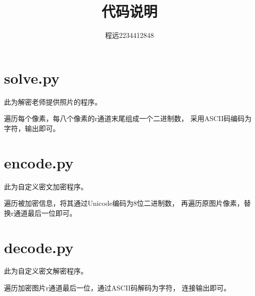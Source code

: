 \documentclass[UTF8]{ctexart}
\begin{document}
\title{\vspace{0cm}代码说明}
\author{程远2234412848}
\date{}
\maketitle

\section{solve.py}
此为解密老师提供照片的程序。

遍历每个像素，每八个像素的r通道末尾组成一个二进制数，
采用ASCII码编码为字符，输出即可。

\section{encode.py}
此为自定义密文加密程序。

遍历被加密信息，将其通过Unicode编码为8位二进制数，
再遍历原图片像素，替换r通道最后一位即可。

\section{decode.py}
此为自定义密文解密程序。

遍历加密图片r通道最后一位，通过ASCII码解码为字符，
连接输出即可。
\end{document}
